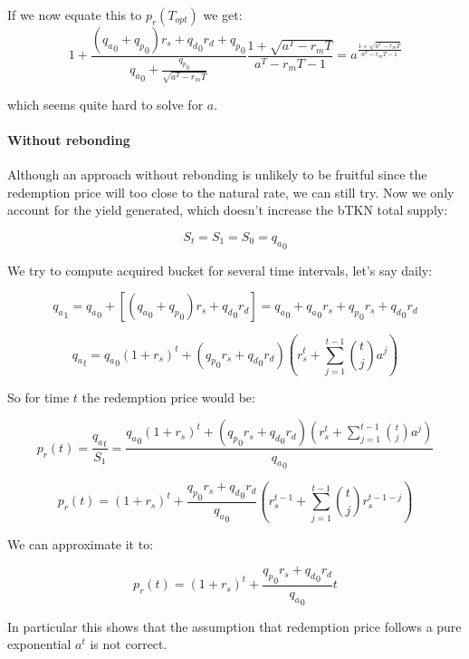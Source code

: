 \documentclass{article}
\begin{document}
If we now equate this to $p_r(T_{opt})$ we get:
\begin{equation}
  \label{}
1 + \frac{({q_a}_0 + {q_p}_0)r_s + {q_d}_0 r_d + {q_p}_0}{{q_a}_0 + \frac{{q_p}_0}{\sqrt{a^T - r_mT}}} \frac{1+ \sqrt{a^T - r_mT}}{a^T - r_mT - 1} = a ^{\frac{1+ \sqrt{a^T - r_mT}}{a^T - r_mT - 1}}
\end{equation}

which seems quite hard to solve for $a$.

\paragraph{Without rebonding}

Although an approach without rebonding is unlikely to be fruitful since the redemption price will too close to the natural rate, we can still try. Now we only account for the yield generated, which doesn’t increase the bTKN total supply:

\[
S_t = S_1 = S_0 = {q_a}_0
\]

We try to compute acquired bucket for several time intervals, let’s say daily:

\[
{q_a}_1 = {q_a}_0 + [({q_a}_0 + {q_p}_0) r_s + {q_d}_0 r_d] = {q_a}_0 + {q_a}_0 r_s + {q_p}_0 r_s + {q_d}_0 r_d
\]

\[
{q_a}_t = {q_a}_0(1+r_s)^t + ({q_p}_0 r_s + {q_d}_0 r_d) \left(r_s^t + \sum_{j=1}^{t-1} \binom{t}{j} a^j \right)
\]

So for time $t$ the redemption price would be:

\[
p_r(t) = \frac{{q_a}_t}{S_1} = \frac{{q_a}_0(1+r_s)^t + ({q_p}_0 r_s + {q_d}_0 r_d) \left(r_s^t + \sum_{j=1}^{t-1} \binom{t}{j} a^j \right)}{{q_a}_0}
\]

\begin{equation}
  \label{eq:conservative_p_r_base_2_a}
p_r(t) = (1+r_s)^t + \frac{{q_p}_0 r_s + {q_d}_0 r_d}{{q_a}_0} \left(r_s^{t-1} + \sum_{j=1}^{t-1} \binom{t}{j} r_s^{t-1-j} \right)
\end{equation}

We can approximate it to:

\begin{equation}
  \label{eq:conservative_p_r_base_2_b}
p_r(t) = (1+r_s)^t + \frac{{q_p}_0 r_s + {q_d}_0 r_d}{{q_a}_0} t
\end{equation}

In particular this shows that the assumption that redemption price follows a pure exponential $a^t$ is not correct.
\end{document}
